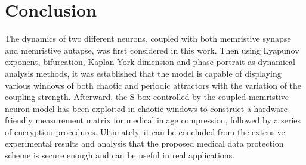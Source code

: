 \documentclass[journal]{IEEEtran/IEEEtran}
\begin{document}


\section{Conclusion}
\label{con}
The dynamics of two different neurons, coupled with both memristive synapse and memristive autapse, was first considered in this work. Then using Lyapunov exponent, bifurcation, Kaplan-York dimension and phase portrait as dynamical analysis methods, it was established that the model is capable  of displaying various windows of both chaotic and periodic attractors with the variation of the coupling strength. Afterward, the S-box controlled by the coupled memristive neuron model has been exploited in chaotic windows to construct a hardware-friendly measurement matrix for medical image compression, followed by a series of encryption procedures. Ultimately, it can be concluded from the extensive experimental results and analysis that the proposed medical data protection scheme is secure enough and can be useful in real applications.



%

\end{document}
